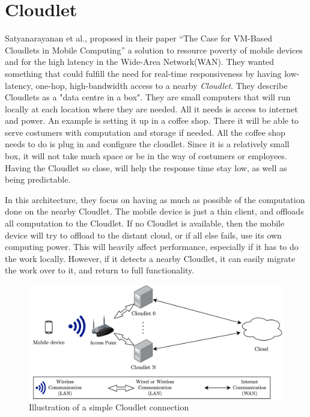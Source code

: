 



\section{Cloudlet} \label{cloudlet} 
Satyanarayanan et al., proposed in their paper “The Case for VM-Based Cloudlets in Mobile Computing”\cite{satyanarayanan_case_2009} a solution to resource poverty of mobile devices and for the high latency in the Wide-Area Network(WAN). They wanted something that could fulfill the need for real-time responsiveness by having low-latency, one-hop, high-bandwidth access to a nearby \textit{Cloudlet}. They describe Cloudlets as a "data centre in a box"\cite{satyanarayanan_case_2009}. They are small computers that will run locally at each location where they are needed. All it needs is access to internet and power. An example is setting it up in a coffee shop. There it will be able to serve costumers with computation and storage if needed. All the coffee shop needs to do is plug in and configure the cloudlet. Since it is a relatively small box, it will not take much space or be in the way of costumers or employees. Having the Cloudlet so close, will help the response time stay low, as well as being predictable.

In this architecture, they focus on having as much as possible of the computation done on the nearby Cloudlet. The mobile device is just a thin client, and offloads all computation to the Cloudlet. If no Cloudlet is available, then the mobile device will try to offload to the distant cloud, or if all else fails, use its own computing power. This will heavily affect performance, especially if it has to do the work locally. However, if it detects a nearby Cloudlet, it can easily migrate the work over to it, and return to full functionality.
 
\begin{figure}[t]
    \centering
    \includegraphics[scale=0.9]{chapters/architectures/figures/Cloudlet.png}
    \caption{Illustration of a simple Cloudlet connection}
    \label{fig:Cloudlet}
\end{figure}

